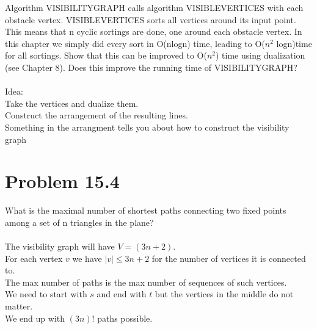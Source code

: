 \documentclass[11pt,psfig]{article}
\begin{document}
Algorithm VISIBILITYGRAPH calls algorithm VISIBLEVERTICES with
each obstacle vertex. VISIBLEVERTICES sorts all vertices around its
input point. This means that n cyclic sortings are done, one around each
obstacle vertex. In this chapter we simply did every sort in O(nlogn)
time, leading to O($n^2$ logn)time for all sortings. Show that this can be
improved to O($n^2$) time using dualization (see Chapter 8). Does this
improve the running time of VISIBILITYGRAPH?\\
\\
Idea:\\
Take the vertices and dualize them. \\
Construct the arrangement of the resulting lines. \\
Something in the arrangment tells you about how to construct the visibility graph

\newpage

\section*{Problem 15.4}

What is the maximal number of shortest paths connecting two ﬁxed
points among a set of n triangles in the plane?\\
\\
The visibility graph will have $V = (3n+2)$.\\
For each vertex $v$ we have $|v| \leq 3n + 2$ for the number of vertices it is connected to. \\
The max number of paths is the max number of sequences of such vertices. \\
We need to start with $s$ and end with $t$ but the vertices in the middle do not matter. \\
We end up with $(3n)!$ paths possible. 
\end{document}

